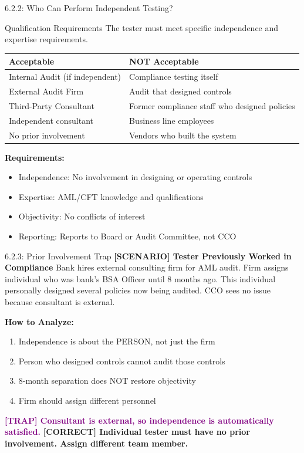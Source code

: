 \documentclass[11pt,a4paper]{beamer}
\newcommand{\trap}[1]{\textcolor{purple}{\textbf{[TRAP] #1}}}
\newcommand{\correct}[1]{\textcolor{green!50!black}{\textbf{[CORRECT] #1}}}
\newcommand{\scenario}[1]{\textcolor{blue!70!black}{\textbf{[SCENARIO] #1}}}
\begin{document}
\begin{frame}{6.2.2: Who Can Perform Independent Testing?}
	\begin{block}{Qualification Requirements}
		The tester must meet specific independence and expertise requirements.
	\end{block}
	\begin{tabular}{p{}|p{}}
		\hline
		\rowcolor{lightgray}
		\textbf{Acceptable} & \textbf{NOT Acceptable} \\
		\hline
		Internal Audit (if independent) & Compliance testing itself \\
		External Audit Firm & Audit that designed controls \\
		Third-Party Consultant & Former compliance staff who designed policies \\
		Independent consultant & Business line employees \\
		No prior involvement & Vendors who built the system \\
		\hline
	\end{tabular}
	\textbf{Requirements:}
	\begin{itemize}
		\item Independence: No involvement in designing or operating controls
		\item Expertise: AML/CFT knowledge and qualifications
		\item Objectivity: No conflicts of interest
		\item Reporting: Reports to Board or Audit Committee, not CCO
	\end{itemize}
\end{frame}

\begin{frame}{6.2.3: Prior Involvement Trap}
	\scenario{Tester Previously Worked in Compliance}
	Bank hires external consulting firm for AML audit. Firm assigns individual who was bank's BSA Officer until 8 months ago. This individual personally designed several policies now being audited. CCO sees no issue because consultant is external.
	
	\vspace{0.1cm}
	\textbf{How to Analyze:}
	\begin{enumerate}
		\item Independence is about the PERSON, not just the firm
		\item Person who designed controls cannot audit those controls
		\item 8-month separation does NOT restore objectivity
		\item Firm should assign different personnel
	\end{enumerate}
	\trap{Consultant is external, so independence is automatically satisfied.}
	\correct{Individual tester must have no prior involvement. Assign different team member.}
\end{frame}
\end{document}
